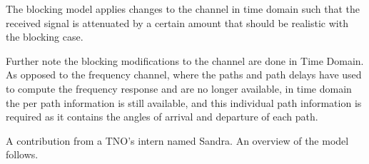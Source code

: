 The blocking model applies changes to the channel in time domain such that the received signal is attenuated by a certain amount that should be realistic with the blocking case. 

Further note the blocking modifications to the channel are done in Time Domain. As opposed to the frequency channel, where the paths and path delays have used to compute the frequency response and are no longer available, in time domain the per path information is still available, and this individual path information is required as it contains the angles of arrival and departure of each path.

A contribution from a TNO's intern named Sandra. An overview of the model follows.


\begin{comment}


\subsection{Parallelisation Engine}

\subsubsection*{Motivation}
Parallelisation is a must. Take the following example as motivation: a single channel coefficient is complex number that takes up 8 bytes, 4 bytes of single-precision (see \ref{optimisation_strats} for why on single-precision is enough) for the real part and 4 bytes for the imaginary part, and we have one of these coefficients for every antenna pair, for a given amount of \acsp{TTI} and \acsp{PRB}. The following equation estimates how many coefficients are needed for a given simulation. We may call \ref{eq:load_estimation} the Load Estimation Equation.

\begin{equation} \label{eq:load_estimation}
    \text{N}_\text{coeff} = \text{N}_{UE} \cdot \text{N}_\text{BS} \cdot \text{N}_{\text{AE}_\text{UE}} \cdot \text{N}_{\text{AE}_\text{BS}} \cdot \text{Sim\_Dur} [\text{s}] \cdot \left(1000 \times 2^\mu\right) [\text{TTIs per s}] \cdot \text{N}_{\text{PRB}} \cdot \text{M}_\text{pol}
\end{equation}

Furthermore, if we want to consider separate layers on the orthogonal polarisations by using the dual-polarised antenna elements, we need to multiply by 2 the number of elements in the arrays that use those kinds of elements, i.e. if we consider \acsp{UE} having only one omnidirectional antenna, then only the \ac{BS}'s number of \acsp{AE} need to be multiplied by 2. Let us call this multiplier the orthogonal polarisation multiplier, and denote it by $M_\text{pol}$.


\end{comment}
